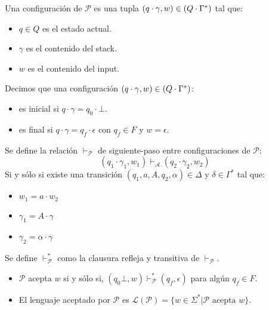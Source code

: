 \documentclass[a4paper,twoside,master.tex]{article}
\begin{document}
\begin{definicion}
    Una configuración de $\mathcal{P}$ es una tupla $(q \cdot \gamma, w) \in (Q \cdot \Gamma^*)$ tal que:
    \begin{itemize}
        \item $q \in Q$ es el estado actual.
        \item $\gamma$ es el contenido del stack.
        \item $w$ es el contenido del input.
    \end{itemize}
\end{definicion}

\begin{definicion}
    Decimos que una configuración $(q \cdot \gamma, w) \in (Q \cdot \Gamma^*)$:
    \begin{itemize}
        \item es inicial si $q \cdot \gamma = q_0 \cdot \bot$.
        \item es final si $q \cdot \gamma = q_f \cdot \epsilon$ con $q_f \in F$ y $w = \epsilon$.
    \end{itemize}
\end{definicion}


\begin{definicion}
    Se define la relación $\vdash_\mathcal{P}$ de siguiente-paso entre configuraciones de $\mathcal{P}$:
    $$(q_1 \cdot \gamma_1, w_1) \vdash_\mathcal{A} (q_2 \cdot \gamma_2, w_2)$$
    Si y sólo si existe una transición $(q_1, a, A, q_2, \alpha) \in \Delta$ y $\delta \in \Gamma^*$ tal que:
    \begin{itemize}
        \item $w_1 = a \cdot w_2$
        \item $\gamma_1 = A \cdot \gamma$
        \item $\gamma_2 = \alpha \cdot \gamma$
    \end{itemize}

    Se define $\vdash^*_\mathcal{P}$ como la clausura refleja y transitiva de $\vdash_\mathcal{P}$.
\end{definicion}

\begin{definicion}
    \begin{itemize}
        \item $\mathcal{P}$ acepta $w$ si y sólo si, $(q_0\bot, w) \vdash^*_\mathcal{P} (q_f, \epsilon)$ para algún $q_f \in F$.
        \item El lenguaje aceptado por $\mathcal{P}$ es $\mathcal{L}(\mathcal{P}) = \{ w \in \Sigma^* | \mathcal{P} \text{ acepta } w \}$.
    \end{itemize}
\end{definicion}
\end{document}
